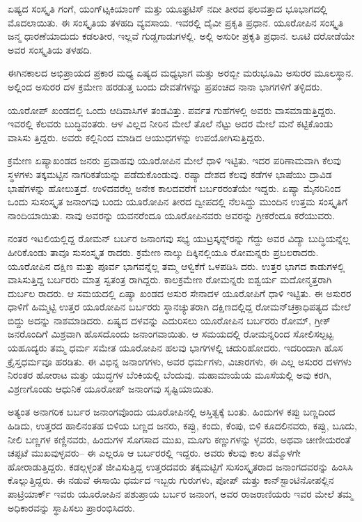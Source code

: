 ಏಷ್ಯದ ಸಂಸ್ಕೃತಿ ಗಂಗೆ, ಯಂಗ್​ಟ್ಸಕಿಯಾಂಗ್​ ಮತ್ತು ಯೂಫ್ರಟಿಸ್​ ನದೀ ತೀರದ ಫಲವತ್ತಾದ ಭೂಭಾಗದಲ್ಲಿ ಮೊದಲಾಯಿತು. ಈ ಸಂಸ್ಕೃತಿಯ ತಳಹದಿ ವ್ಯವಸಾಯ. ಇವರಲ್ಲಿ ದೈವೀ ಪ್ರಕೃತಿ ಪ್ರಧಾನ. ಯೂರೋಪಿನ ಸಂಸ್ಕೃತಿ ಜನ್ಮ ಧಾರಣೆಯಾದುದು ಕಡಲತೀರ, ಇಲ್ಲವೆ ಗುಡ್ಡಗಾಡುಗಳಲ್ಲಿ. ಅಲ್ಲಿ ಅಸುರೀ ಪ್ರಕೃತಿ ಪ್ರಧಾನ. ಲೂಟಿ ದರೋಡೆಯೇ ಅವರ ಸಂಸ್ಕೃತಿಯ ತಳಹದಿ.

ಈಗಿನಕಾಲದ ಅಭಿಪ್ರಾಯದ ಪ್ರಕಾರ ಮಧ್ಯ ಏಷ್ಯದ ಮಧ್ಯಭಾಗ ಮತ್ತು ಅರಬ್ಬೀ ಮರುಭೂಮಿ ಅಸುರರ ಮೂಲಸ್ಥಾನ. ಅಲ್ಲಿಂದ ಅಸುರರ ದಳ ಕ್ರಮೇಣ ಹರಡುತ್ತ ಬಂದು ದೇವತೆಗಳನ್ನು ಪ್ರಪಂಚದ ನಾನಾ ಭಾಗಗಳಿಗೆ ತಳ್ಳಿದರು.

ಯೂರೋಪ್​ ಖಂಡದಲ್ಲಿ ಒಂದು ಆದಿವಾಸಿಗಳ ತಂಡವಿತ್ತು. ಪರ್ವತ ಗುಹೆಗಳಲ್ಲಿ ಅವರು ವಾಸಮಾಡುತ್ತಿದ್ದರು. ಇವರಲ್ಲಿ ಕೆಲವರು ಬುದ್ಧಿವಂತರು. ಆಳ ವಿಲ್ಲದ ನೀರಿನ ಮೇಲೆ ತೊಲೆ ನೆಟ್ಟು ಅದರ ಮೇಲೆ ಮನೆ ಕಟ್ಟಿಕೊಂಡು ವಾಸಿಸು ತ್ತಿದ್ದರು. ಅವರು ಕಲ್ಲಿನಿಂದ ಮಾಡಿದ ಆಯುಧಗಳನ್ನು ಉಪಯೋಗಿಸುತ್ತಿದ್ದರು.

ಕ್ರಮೇಣ ಏಷ್ಯಾಖಂಡದ ಜನರು ಪ್ರವಾಹವು ಯೂರೋಪಿನ ಮೇಲೆ ಧಾಳಿ ಇಟ್ಟಿತು. ಇದರ ಪರಿಣಾಮವಾಗಿ ಕೆಲವು ಸ್ಥಳಗಳು ತಕ್ಕಮಟ್ಟಿನ ನಾಗರಿಕತೆಯನ್ನು ಪಡೆದುಕೊಂಡುವು. ರಷ್ಯಾ ದೇಶದ ಕೆಲವು ಕಡೆಗಳ ಭಾಷೆಯು ದ್ರಾವಿಡ ಭಾಷೆಗಳನ್ನು ಹೋಲುತ್ತದೆ. ಉಳಿದವರೆಲ್ಲ ಅನೇಕ ಕಾಲದವರೆಗೆ ಬರ್ಬರರಂತೆಯೇ ಇದ್ದರು. ಏಷ್ಯಾ ಮೈನರಿನಿಂದ ಒಂದು ಸುಸಂಸ್ಕೃತ ಜನಾಂಗವು ಬಂದು ಯೂರೋಪಿನ ತೀರದ ದ್ವೀಪದಲ್ಲಿ ನೆಲಸಿದ್ದು ಮುಂದಿನ ಉತ್ತಮ ಸಂಸ್ಕೃತಿಗೆ ನಾಂದಿಯಾಯಿತು. ನಾವು ಅವರನ್ನು ಯವನರೆಂದೂ ಯೂರೋಪಿನವರು ಅವರನ್ನು ಗ್ರೀಕರೆಂದೂ ಕರೆಯುವರು.

ನಂತರ ಇಟಲಿಯಲ್ಲಿದ್ದ ರೋಮನ್​ ಬರ್ಬರ ಜನಾಂಗವು ಸಭ್ಯ ಯುಟ್ರಸ್ಕನ್ನ್​ರನ್ನು ಗೆದ್ದು ಅವರ ವಿದ್ಯಾ ಬುದ್ಧಿಯನ್ನೆಲ್ಲ ಹೀರಿಕೊಂಡು ತಾವೂ ಸುಸಂಸ್ಕೃತ ರಾದರು. ಕ್ರಮೇಣ ನಾಲ್ಕು ದಿಕ್ಕಿನಲ್ಲಿಯೂ ರೋಮನ್ನರು ಪ್ರಬಲರಾದರು. ಯೂರೋಪಿನ ದಕ್ಷಿಣ ಮತ್ತು ಪೂರ್ವ ಭಾಗವನ್ನೆಲ್ಲ ತಮ್ಮ ಆಳ್ವಿಕೆಗೆ ಒಳಪಡಿಸಿ ದರು. ಉತ್ತರ ಭಾಗದ ಕಾಡುಗಳಲ್ಲಿ ವಾಸಿಸುತ್ತಿದ್ದ ಬರ್ಬರರು ಮಾತ್ರ ಸ್ವತಂತ್ರ ರಾಗಿದ್ದರು. ಕಾಲಕ್ರಮೇಣ ರೋಮನ್ನರು ಐಶ್ವರ್ಯ ಮದೋನ್ಮತ್ತರಾಗಿ ದುರ್ಬಲ ರಾದರು. ಆ ಸಮಯದಲ್ಲಿ ಏಷ್ಯಾ ಖಂಡದ ಅಸುರ ಸೇನಾದಳ ಯೂರೋಪಿಗೆ ಧಾಳಿ ಇಟ್ಟಿತು. ಈ ಅಸುರರ ಧಾಳಿಗೆ ಹಿಮ್ಮಟ್ಟಿ ಉತ್ತರ ಯೂರೋಪಿನ ಬರ್ಬರರು ಸ್ಥಾನಚ್ಯುತರಾಗಿ ದಕ್ಷಿಣದಲ್ಲಿದ್ದ ರೋಮನ್​ ಚಕ್ರಾಧಿಪತ್ಯದ ಮೇಲೆ ಬಿದ್ದು ಅದನ್ನು ನಾಶಮಾಡಿದರು. ಏಷ್ಯದ ದಳವನ್ನು ಎದುರಿಸಲು ಯೂರೋಪಿನ ಬರ್ಬರರು ರೋಮ್​, ಗ್ರೀಕ್​ ಜನರೊಂದಿಗೆ ಮಿಶ್ರವಾಗಿ ಹೊಸದೊಂದು ಜನಾಂಗವಾಯಿತು. ಆ ಸಮಯದಲ್ಲಿ ರೋಮನ್ನರಿಂದ ಸೋಲಿಸಲ್ಪಟ್ಟ ಯಹೂದ್ಯರು ತಮ್ಮ ಧರ್ಮ ಸಮೇತ ಯೂರೋಪಿನ ಹಲವು ಭಾಗಗಳಲ್ಲಿ ಚದುರಿಹೋದರು. ಇದರಿಂದಾಗಿ ಹೊಸ ಕ್ರೈಸ್ತಧರ್ಮವೂ ಹರಡಿತು. ಈ ವಿಭಿನ್ನ ಜನಾಂಗಗಳು, ಅವರ ಧರ್ಮಗಳು, ವಿಚಾರಗಳು, ಈ ಎಲ್ಲ ಅಸುರರ ದಳಗಳು ನಿರಂತರ ಹೋರಾಟ ಮತ್ತು ಯುದ್ಧಗಳ ಬೆಂಕಿಯಲ್ಲಿ ಬೆಂದುವು. ಮಹಾಮಾಯೆಯ ಮೂಸೆಯಲ್ಲಿ ಅವು ಕರಗಿ, ವಿಶ್ರಣಗೊಂಡು ಆಧುನಿಕ ಯೂರೋಪ್​ ಜನಾಂಗವು ಸೃಷ್ಟಿಯಾಯಿತು.

ಅತ್ಯಂತ ಅನಾಗರಿಕ ಬರ್ಬರ ಜನಾಂಗವೊಂದು ಯೂರೋಪಿನಲ್ಲಿ ಅಸ್ತಿತ್ವಕ್ಕೆ ಬಂತು. ಹಿಂದುಗಳ ಕಪ್ಪು ಬಣ್ಣದಿಂದ ಹಿಡಿದು, ಉತ್ತರದ ಹಾಲಿನಂತಹ ಬಿಳಿಯ ಬಣ್ಣದ ಜನರು, ಕಪ್ಪು, ಕಂದು, ಕೆಂಪು, ಬಿಳಿ ಕೂದಲಿನವರು, ಕಪ್ಪು, ಬೂದು, ನೀಲಿ ಬಣ್ಣಗಳ ಕಣ್ಣಿನವರು, ಹಿಂದುಗಳ ಸೊಗಸಾದ ಮುಖ, ಮೂಗು ಕಣ್ಣುಗಳನ್ನು ಳ್ಳವರು, ಅಥವಾ ಚೀಣೀಯರಂತೆ ಚಪ್ಪಟೆ ಮುಖವುಳ್ಳವರು– ಈ ಎಲ್ಲರೂ ಆ ಬರ್ಬರರಲ್ಲಿ ಇದ್ದರು. ಅವರು ಕೆಲವು ಕಾಲ ತಮ್ಮೊಳಗೇ ಹೋರಾಡುತ್ತಿದ್ದರು. ಕಡಲ್ಗಳ್ಳಂತೆ ಜೀವಿಸುತ್ತಿದ್ದ ಉತ್ತರದವರು ತಕ್ಕಮಟ್ಟಿಗೆ ಸುಸಂಸ್ಕೃತರಾದ ಜನಾಂಗದವರನ್ನು ಹಿಂಸಿಸಿ ಕೊಲ್ಲುತ್ತಿದ್ದರು. ಈ ನಡುವೆ ಈಸಾಯಿ ಧರ್ಮದ ಇಬ್ಬರು ಗುರುಗಳು, ಪೋಪ್​ ಮತ್ತು ಕಾನ್​ಸ್ಟಾಂಟಿನೋಪಲ್ಲಿನ ಪಾಟ್ರಿಯಾರ್ಕ್​ ಇವರು ಯೂರೋಪಿನ ಪಶುಪ್ರಾಯ ಬರ್ಬರ ಜನಾಂಗ, ಅವರ ರಾಜರಾಣಿಯರು ಇವರ ಮೇಲೆ ತಮ್ಮ ಅಧಿಕಾರವನ್ನು ಸ್ಥಾಪಿಸಲು ಪ್ರಾರಂಭಿಸಿದರು.

